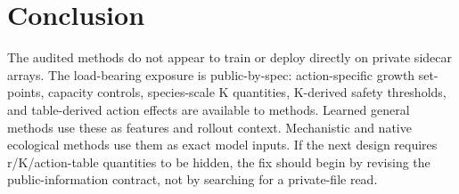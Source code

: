 \documentclass[11pt]{article}
\newcommand{\1}{\mathbf{1}}
\begin{document}
\section{Conclusion}

The audited methods do not appear to train or deploy directly on private sidecar
arrays. The load-bearing exposure is public-by-spec: action-specific growth
set-points, capacity controls, species-scale K quantities, K-derived safety
thresholds, and table-derived action effects are available to methods. Learned
general methods use these as features and rollout context. Mechanistic and native
ecological methods use them as exact model inputs. If the next design requires
r/K/action-table quantities to be hidden, the fix should begin by revising the
public-information contract, not by searching for a private-file read.
\end{document}

